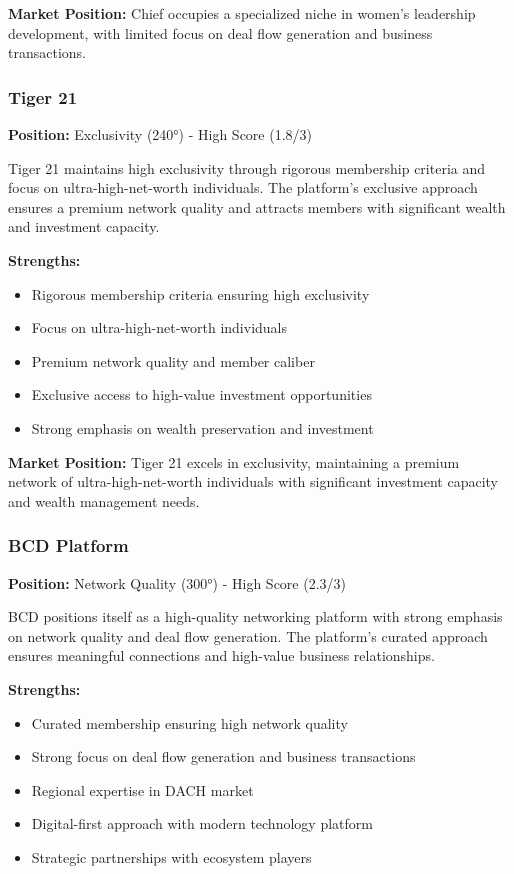 \textbf{Market Position:} Chief occupies a specialized niche in women's leadership development, with limited focus on deal flow generation and business transactions.

\subsubsection{Tiger 21}
\textbf{Position:} Exclusivity (240°) - High Score (1.8/3)

Tiger 21 maintains high exclusivity through rigorous membership criteria and focus on ultra-high-net-worth individuals. The platform's exclusive approach ensures a premium network quality and attracts members with significant wealth and investment capacity.

\textbf{Strengths:}
\begin{itemize}
    \item Rigorous membership criteria ensuring high exclusivity
    \item Focus on ultra-high-net-worth individuals
    \item Premium network quality and member caliber
    \item Exclusive access to high-value investment opportunities
    \item Strong emphasis on wealth preservation and investment
\end{itemize}

\textbf{Market Position:} Tiger 21 excels in exclusivity, maintaining a premium network of ultra-high-net-worth individuals with significant investment capacity and wealth management needs.

\subsubsection{BCD Platform}
\textbf{Position:} Network Quality (300°) - High Score (2.3/3)

BCD positions itself as a high-quality networking platform with strong emphasis on network quality and deal flow generation. The platform's curated approach ensures meaningful connections and high-value business relationships.

\textbf{Strengths:}
\begin{itemize}
    \item Curated membership ensuring high network quality
    \item Strong focus on deal flow generation and business transactions
    \item Regional expertise in DACH market
    \item Digital-first approach with modern technology platform
    \item Strategic partnerships with ecosystem players
\end{itemize}

